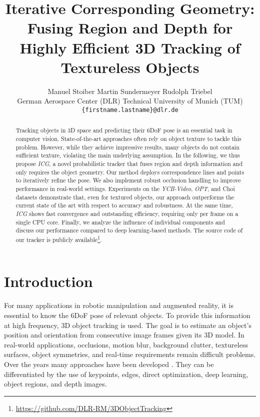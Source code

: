 \documentclass[10pt,twocolumn,letterpaper]{article}
\begin{document}
\title{Iterative Corresponding Geometry: Fusing Region and Depth for\\ Highly Efficient 3D Tracking of Textureless Objects}

\author{Manuel Stoiber \qquad Martin Sundermeyer \qquad Rudolph Triebel\\
	German Aerospace Center (DLR) \qquad  Technical University of Munich (TUM)\\
	{\tt\small\{firstname.lastname\}@dlr.de}
}
\maketitle



\begin{abstract}
Tracking objects in 3D space and predicting their \acs{6DoF} pose is an essential task in computer vision.
State-of-the-art approaches often rely on object texture to tackle this problem.
However, while they achieve impressive results, many objects do not contain sufficient texture, violating the main underlying assumption.
In the following, we thus propose \textit{ICG}, a novel probabilistic tracker that fuses region and depth information and only requires the object geometry.
Our method deploys correspondence lines and points to iteratively refine the pose.
We also implement robust occlusion handling to improve performance in real-world settings.
Experiments on the \textit{YCB-Video}, \textit{OPT}, and Choi datasets demonstrate that, even for textured objects, our approach outperforms the current state of the art with respect to accuracy and robustness.
At the same time, \textit{ICG} shows fast convergence and outstanding efficiency, requiring only  per frame on a single CPU core.
Finally, we analyze the influence of individual components and discuss our performance compared to deep learning-based methods.
The source code of our tracker is publicly available\footnote{\url{https://github.com/DLR-RM/3DObjectTracking}}.
\end{abstract}
 

\section{Introduction}\label{sec:in}
For many applications in robotic manipulation and augmented reality, it is essential to know the \ac{6DoF} pose of relevant objects.
To provide this information at high frequency, 3D object tracking is used.
The goal is to estimate an object's position and orientation from consecutive image frames given its 3D model.
In real-world applications, occlusions, motion blur, background clutter, textureless surfaces, object symmetries, and real-time requirements remain difficult problems.
Over the years many approaches have been developed \cite{Lepetit2005, Yilmaz2006}.
They can be differentiated by the use of keypoints, edges, direct optimization, deep learning, object regions, and depth images.
\end{document}
